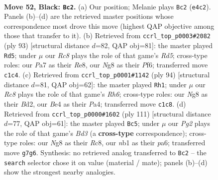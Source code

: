 \documentclass[11pt]{article}
\begin{document}
\clearpage

\begin{figure}[p]\centering
\begin{subfigure}{0.46\textwidth}\centering
\resizebox{\linewidth}{!}{%
\newchessgame
\chessboard[
  setfen={5bn1/p5pk/P6P/1p3p2/1P2bP1K/1R2P3/8/RNr5 b - - 0 52},
  showmover=false,
  pgfstyle=straightmove, color=movearrow, markmove={e4-c2}
]}
\caption{}
\end{subfigure}\hfill
\begin{subfigure}{0.46\textwidth}\centering
\resizebox{\linewidth}{!}{%
\newchessgame
\chessboard[
  setfen={4r3/6k1/3P1pP1/1pP5/p2r3p/RP1N1Kb1/1P6/3R4 b - - 0 47},
  showmover=false,
  pgfstyle=straightmove, color=movearrow, markmove={d4-d5}
]}
\caption{}
\end{subfigure}
\\[4pt]
\begin{subfigure}{0.46\textwidth}\centering
\resizebox{\linewidth}{!}{%
\newchessgame
\chessboard[
  setfen={8/1p2r1k1/p1r3nR/4p1R1/PP1p2P1/3K1P2/3B4/8 w - - 3 48},
  showmover=false,
  pgfstyle=straightmove, color=movearrow, markmove={h6-h1}
]}
\caption{}
\end{subfigure}\hfill
\begin{subfigure}{0.46\textwidth}\centering
\resizebox{\linewidth}{!}{%
\newchessgame
\chessboard[
  setfen={2r5/8/P2bk1p1/rp2P2p/P1p1R3/2P4P/R2BK1P1/8 b - - 0 56},
  showmover=false,
  pgfstyle=straightmove, color=movearrow, markmove={d6-c5}
]}
\caption{}
\end{subfigure}
\caption{\textbf{Move 52, Black: \texttt{Bc2}.} (a) Our position; Melanie plays \texttt{Bc2} (\texttt{e4c2}). Panels (b)--(d) are the retrieved master positions whose correspondence most drove this move (highest QAP objective among those that transfer to it). (b) Retrieved from \texttt{ccrl\_top\_p0003\#2082} (ply 93) [structural distance $d$=82, QAP obj=81]: the master played \texttt{Rd5}; under $\mu$ our \emph{Rc8} plays the role of that game's \emph{Rd5}; cross-type roles: our \emph{P}a7 as their \emph{R}e8, our \emph{N}g8 as their \emph{P}f6; transferred move \texttt{c1c4}. (c) Retrieved from \texttt{ccrl\_top\_p0001\#1142} (ply 94) [structural distance $d$=81, QAP obj=62]: the master played \texttt{Rh1}; under $\mu$ our \emph{Rc8} plays the role of that game's \emph{Rh6}; cross-type roles: our \emph{N}g8 as their \emph{B}d2, our \emph{B}e4 as their \emph{P}a4; transferred move \texttt{c1c8}. (d) Retrieved from \texttt{ccrl\_top\_p0000\#1602} (ply 111) [structural distance $d$=77, QAP obj=61]: the master played \texttt{Bc5}; under $\mu$ our \emph{Pg2} plays the role of that game's \emph{Bd3} (a \textbf{cross-type} correspondence); cross-type roles: our \emph{N}g8 as their \emph{R}c8, our \emph{n}b1 as their \emph{p}a6; transferred move \texttt{g7g6}. Synthesis: no retrieved analog transferred to \texttt{Bc2} -- the \texttt{search} selector chose it on value (material / mate); panels (b)--(d) show the strongest nearby analogies.}
\label{fig:thought-m103}
\end{figure}
\end{document}
